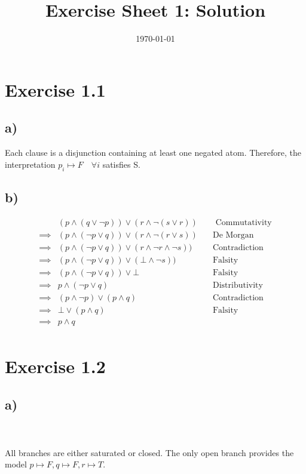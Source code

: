 \documentclass[a4paper]{article}
\begin{document}
\title{Exercise Sheet 1: Solution}
\author{}
\date{\today}
\section{Exercise 1.1}
\subsection{a)}
Each clause is a disjunction containing at least one negated atom. Therefore, the interpretation $p_i \mapsto F \quad \forall i$ satisfies S.
\subsection{b)}
\begin{align*}
&(p \land (q \lor \lnot p))\lor(r \land \lnot(s \lor r)) \quad& \text{ Commutativity}\\
\implies&(p \land (\lnot p \lor q))\lor(r \land \lnot(r \lor s)) & \text{De Morgan}\\
\implies&(p \land (\lnot p \lor q))\lor(r \land \lnot r \land \lnot s)) & \text{Contradiction}\\
\implies&(p \land (\lnot p \lor q))\lor(\bot \land \lnot s)) & \text{Falsity}\\
\implies&(p \land (\lnot p \lor q))\lor\bot & \text{Falsity}\\
\implies& p \land (\lnot p \lor q) & \text{Distributivity}\\
\implies&(p \land \lnot p) \lor (p \land q) & \text{Contradiction}\\
\implies&\bot \lor (p \land q) & \text{Falsity}\\
\implies& p \land q & \\
\end{align*}
\section{Exercise 1.2}
\subsection{a)}
\\\\
All branches are either saturated or closed. The only open branch provides the model
$p \mapsto F, q \mapsto F, r \mapsto T$.
\end{document}
